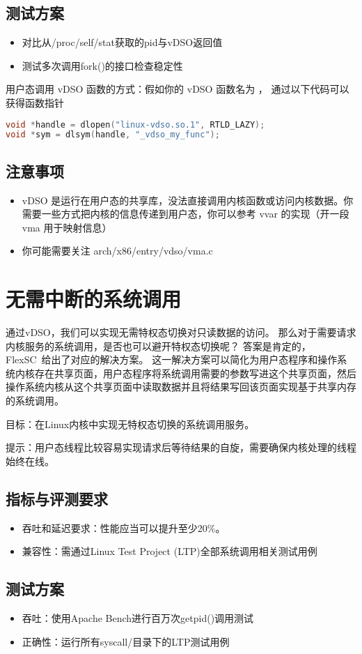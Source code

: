 \subsection*{测试方案}
\begin{itemize}
    \item 对比从/proc/self/stat获取的pid与vDSO返回值
    \item 测试多次调用fork()的接口检查稳定性
\end{itemize}

用户态调用 vDSO 函数的方式：假如你的 vDSO 函数名为 ， 通过以下代码可以获得函数指针
\begin{lstlisting}[language=C]
void *handle = dlopen("linux-vdso.so.1", RTLD_LAZY);
void *sym = dlsym(handle, "_vdso_my_func");
\end{lstlisting}

\subsection*{注意事项}
\begin{itemize}
    \item vDSO 是运行在用户态的共享库，没法直接调用内核函数或访问内核数据。你需要一些方式把内核的信息传递到用户态，你可以参考 vvar 的实现（开一段 vma 用于映射信息）
    \item 你可能需要关注 arch/x86/entry/vdso/vma.c
\end{itemize}

\section{无需中断的系统调用}
通过vDSO，我们可以实现无需特权态切换对只读数据的访问。
那么对于需要请求内核服务的系统调用，是否也可以避开特权态切换呢？
答案是肯定的，FlexSC~\cite{soares2010flexsc}给出了对应的解决方案。
这一解决方案可以简化为用户态程序和操作系统内核存在共享页面，用户态程序将系统调用需要的参数写进这个共享页面，然后操作系统内核从这个共享页面中读取数据并且将结果写回该页面实现基于共享内存的系统调用。

目标：在Linux内核中实现无特权态切换的系统调用服务。

提示：用户态线程比较容易实现请求后等待结果的自旋，需要确保内核处理的线程始终在线。

\subsection*{指标与评测要求}
\begin{itemize}
    \item 吞吐和延迟要求：性能应当可以提升至少20\%。
    \item 兼容性：需通过Linux Test Project (LTP)全部系统调用相关测试用例
\end{itemize}


\subsection*{测试方案}
\begin{itemize}
    \item 吞吐：使用Apache Bench进行百万次getpid()调用测试
    \item 正确性：运行所有syscall/目录下的LTP测试用例
\end{itemize}
